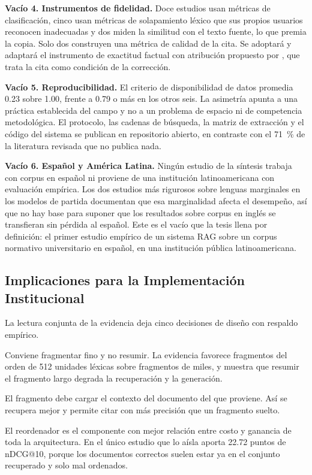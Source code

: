 \documentclass[man,12pt,floatsintext,donotrepeattitle]{apa7}
\begin{document}
\textbf{Vacío 4. Instrumentos de fidelidad.} Doce estudios usan métricas de clasificación, cinco usan métricas de solapamiento léxico que sus propios usuarios reconocen inadecuadas y dos miden la similitud con el texto fuente, lo que premia la copia. Solo dos construyen una métrica de calidad de la cita. Se adoptará y adaptará el instrumento de exactitud factual con atribución propuesto por \textcite{stepanov2026}, que trata la cita como condición de la corrección.

\textbf{Vacío 5. Reproducibilidad.} El criterio de disponibilidad de datos promedia 0.23 sobre 1.00, frente a 0.79 o más en los otros seis. La asimetría apunta a una práctica establecida del campo y no a un problema de espacio ni de competencia metodológica. El protocolo, las cadenas de búsqueda, la matriz de extracción y el código del sistema se publican en repositorio abierto, en contraste con el 71~\% de la literatura revisada que no publica nada.

\textbf{Vacío 6. Español y América Latina.} Ningún estudio de la síntesis trabaja con corpus en español ni proviene de una institución latinoamericana con evaluación empírica. Los dos estudios más rigurosos sobre lenguas marginales en los modelos de partida documentan que esa marginalidad afecta el desempeño, así que no hay base para suponer que los resultados sobre corpus en inglés se transfieran sin pérdida al español. Este es el vacío que la tesis llena por definición: el primer estudio empírico de un sistema RAG sobre un corpus normativo universitario en español, en una institución pública latinoamericana.

\subsection{Implicaciones para la Implementación Institucional}
La lectura conjunta de la evidencia deja cinco decisiones de diseño con respaldo empírico.

Conviene fragmentar fino y no resumir. La evidencia favorece fragmentos del orden de 512 unidades léxicas sobre fragmentos de miles, y muestra que resumir el fragmento largo degrada la recuperación y la generación.

El fragmento debe cargar el contexto del documento del que proviene. Así se recupera mejor y permite citar con más precisión que un fragmento suelto.

El reordenador es el componente con mejor relación entre costo y ganancia de toda la arquitectura. En el único estudio que lo aísla aporta 22.72 puntos de nDCG@10, porque los documentos correctos suelen estar ya en el conjunto recuperado y solo mal ordenados.
\end{document}
